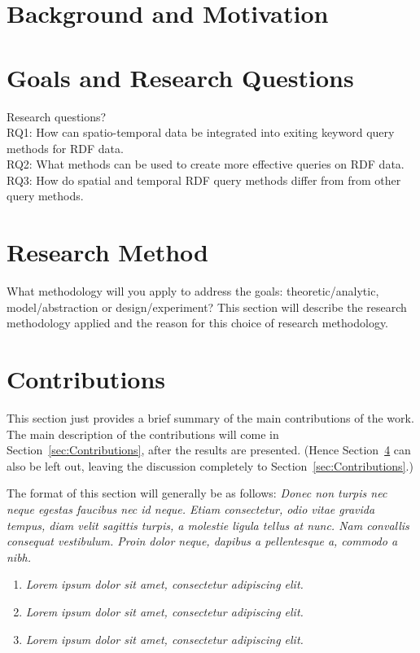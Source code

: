 \section{Background and Motivation}
\label{sec:BackgroundAndMotivation}


\section{Goals and Research Questions}
\label{sec:Goals and Research Questions}
Research questions?\\
RQ1: How can spatio-temporal data be integrated into exiting keyword query methods for RDF data.\\
RQ2: What methods can be used to create more effective queries on RDF data.\\
RQ3: How do spatial and temporal RDF query methods differ from from other query methods.\\

\section{Research Method}
\label{sec:researchMethod}

What methodology will you apply to address the goals: theoretic/analytic, model/abstraction or design/experiment? 
This section will describe the research methodology applied and the reason for this choice of research methodology.  

\section{Contributions}
\label{sec:IntroContributions}

This section just provides a brief summary of the main contributions of the work. 
The main description of the contributions will come in Section~\ref{sec:Contributions}, after the results are presented. 
(Hence Section~\ref{sec:IntroContributions} can also be left out, leaving the discussion completely to Section~\ref{sec:Contributions}.)

The format of this section will generally be as follows:
{\em
Donec non turpis nec neque egestas faucibus nec id neque. Etiam consectetur, odio vitae gravida tempus, diam velit sagittis turpis, a molestie ligula tellus at nunc. Nam convallis consequat vestibulum. Proin dolor neque, dapibus a pellentesque a, commodo a nibh.}

\begin{enumerate}
\item {\em Lorem ipsum dolor sit amet, consectetur adipiscing elit.}
\item {\em Lorem ipsum dolor sit amet, consectetur adipiscing elit.}
\item {\em Lorem ipsum dolor sit amet, consectetur adipiscing elit.}
\end{enumerate}

